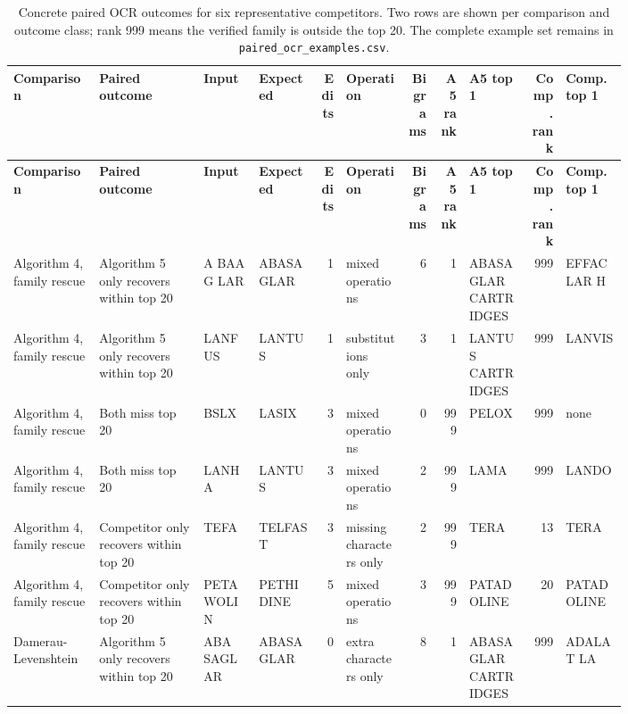 \begin{landscape}
\begin{tiny}
\setlength{\tabcolsep}{0.8pt}
\renewcommand{\arraystretch}{1.05}
\begin{longtable}{@{}L{0.14\linewidth}L{0.17\linewidth}L{0.09\linewidth}L{0.10\linewidth}rL{0.10\linewidth}rrL{0.10\linewidth}rL{0.10\linewidth}@{}}
\caption{Concrete paired OCR outcomes for six representative competitors. Two rows are shown per comparison and outcome class; rank 999 means the verified family is outside the top 20. The complete example set remains in \texttt{paired\_ocr\_examples.csv}.}\label{tab:expanded-paired-ocr-examples}\\
\toprule
\textbf{Comparison} & \textbf{Paired outcome} & \textbf{Input} & \textbf{Expected} & \textbf{Edits} & \textbf{Operation} & \textbf{Bigrams} & \textbf{A5 rank} & \textbf{A5 top 1} & \textbf{Comp. rank} & \textbf{Comp. top 1} \\
\midrule
\endfirsthead
\toprule
\textbf{Comparison} & \textbf{Paired outcome} & \textbf{Input} & \textbf{Expected} & \textbf{Edits} & \textbf{Operation} & \textbf{Bigrams} & \textbf{A5 rank} & \textbf{A5 top 1} & \textbf{Comp. rank} & \textbf{Comp. top 1} \\
\midrule
\endhead
Algorithm 4, family rescue & Algorithm 5 only recovers within top 20 & A BAA G LAR & ABASAGLAR & 1 & mixed operations & 6 & 1 & ABASAGLAR CARTRIDGES & 999 & EFFACLAR H \\
Algorithm 4, family rescue & Algorithm 5 only recovers within top 20 & LANFUS & LANTUS & 1 & substitutions only & 3 & 1 & LANTUS CARTRIDGES & 999 & LANVIS \\
Algorithm 4, family rescue & Both miss top 20 & BSLX & LASIX & 3 & mixed operations & 0 & 999 & PELOX & 999 & none \\
Algorithm 4, family rescue & Both miss top 20 & LANHA & LANTUS & 3 & mixed operations & 2 & 999 & LAMA & 999 & LANDO \\
Algorithm 4, family rescue & Competitor only recovers within top 20 & TEFA & TELFAST & 3 & missing characters only & 2 & 999 & TERA & 13 & TERA \\
Algorithm 4, family rescue & Competitor only recovers within top 20 & PETAWOLIN & PETHIDINE & 5 & mixed operations & 3 & 999 & PATADOLINE & 20 & PATADOLINE \\
Damerau-Levenshtein & Algorithm 5 only recovers within top 20 & ABA SAGLAR & ABASAGLAR & 0 & extra characters only & 8 & 1 & ABASAGLAR CARTRIDGES & 999 & ADALAT LA \\

\end{longtable}
\end{tiny}
\end{landscape}
